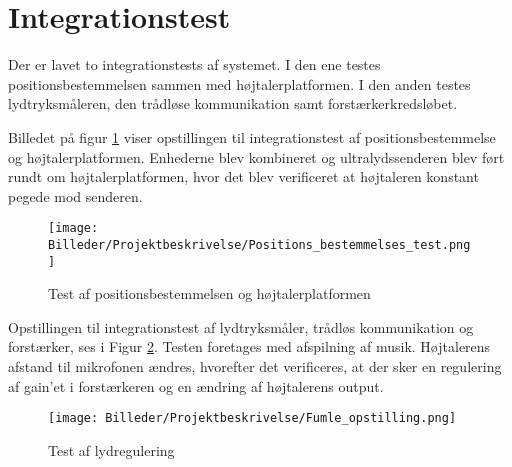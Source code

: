\section{Integrationstest}
Der er lavet to integrationstests af systemet. I den ene testes positionsbestemmelsen sammen med højtalerplatformen. I den anden testes lydtryksmåleren, den trådløse kommunikation samt forstærkerkredsløbet.

Billedet på figur \ref{fig:Positions_bestemmelses_test} viser opstillingen til integrationstest af positionsbestemmelse og højtalerplatformen. Enhederne blev kombineret og ultralydssenderen blev ført rundt om højtalerplatformen, hvor det blev verificeret at højtaleren konstant pegede mod senderen.

\begin{figure}[H]
  \centering
    \texttt{[image: Billeder/Projektbeskrivelse/Positions\_bestemmelses\_test.png]}
    \caption{Test af positionsbestemmelsen og højtalerplatformen}
    \label{fig:Positions_bestemmelses_test}
\end{figure}


Opstillingen til integrationstest af lydtryksmåler, trådløs kommunikation og forstærker, ses i Figur \ref{fig:Fumle_opstilling}. Testen foretages med afspilning af musik. Højtalerens afstand til mikrofonen ændres, hvorefter det verificeres, at der sker en regulering af gain’et i forstærkeren og en ændring af højtalerens output.

\begin{figure}[H]
  \centering
    \texttt{[image: Billeder/Projektbeskrivelse/Fumle\_opstilling.png]}
    \caption{Test af lydregulering}
    \label{fig:Fumle_opstilling}
\end{figure}

